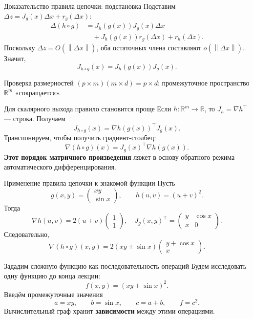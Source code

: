 \documentclass[aspectratio=169,10pt]{beamer}
\newcommand{\R}{\mathbb{R}}
\newcommand{\norm}[1]{\left\lVert #1\right\rVert}
\newcommand{\grad}{\nabla}
\begin{document}
\begin{frame}{Доказательство правила цепочки: подстановка}
\footnotesize
Подставим $\Delta z=J_g(x)\Delta x+r_g(\Delta x)$:
\[
\begin{aligned}
\Delta(h\circ g)
&=J_h(g(x))J_g(x)\Delta x\\
&\quad+J_h(g(x))r_g(\Delta x)+r_h(\Delta z).
\end{aligned}
\]
Поскольку $\Delta z=O(\norm{\Delta x})$, оба остаточных члена составляют $o(\norm{\Delta x})$. Значит,
\[
\boxed{J_{h\circ g}(x)=J_h(g(x))J_g(x).}
\]
\begin{alertblock}{Проверка размерностей}
$(p\times m)(m\times d)=p\times d$: промежуточное пространство $\R^m$ «сокращается».
\end{alertblock}
\end{frame}
\begin{frame}{Для скалярного выхода правило становится проще}
\small
Если $h:\R^m\to\R$, то $J_h=\grad h^\top$ — строка. Получаем
\[
J_{h\circ g}(x)=\grad h(g(x))^\top J_g(x).
\]
Транспонируем, чтобы получить градиент-столбец:
\[
\boxed{\grad(h\circ g)(x)=J_g(x)^\top\grad h(g(x)).}
\]
\textbf{Этот порядок матричного произведения} ляжет в основу обратного режима автоматического дифференцирования.
\end{frame}

\begin{frame}{Применение правила цепочки к знакомой функции}
\small
Пусть
\[
g(x,y)=\begin{pmatrix}xy\\\sin x\end{pmatrix},\qquad
h(u,v)=(u+v)^2.
\]
Тогда
\[
\grad h(u,v)=2(u+v)\begin{pmatrix}1\\1\end{pmatrix},
\quad
J_g(x,y)^\top=\begin{pmatrix}y&\cos x\\x&0\end{pmatrix}.
\]
Следовательно,
\[
\boxed{\grad(h\circ g)(x,y)=2(xy+\sin x)
\begin{pmatrix}y+\cos x\\x\end{pmatrix}.}
\]
\end{frame}

\begin{frame}{Зададим сложную функцию как последовательность операций}
\small
Будем исследовать одну функцию до конца лекции:
\[
\boxed{f(x,y)=(xy+\sin x)^2.}
\]
Введём промежуточные значения
\[
a=xy,\qquad b=\sin x,\qquad c=a+b,\qquad f=c^2.
\]
Вычислительный граф хранит \textbf{зависимости} между этими операциями.
\end{frame}
\end{document}
